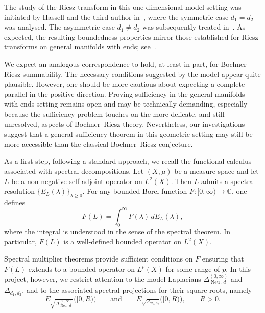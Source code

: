 \documentclass[12pt]{amsart}
\newcommand\Neu{\operatorname{Neu}}
\newcommand\LapoN{\Delta^{(0, \infty)}_{\Neu, d}}
\newcommand\C{\mathbb{C}}
\begin{document}
 The study of the Riesz transform in this one-dimensional model setting was initiated by Hassell and the third author in~\cite{HS1D}, where the symmetric case \(d_1=d_2\) was analysed. The asymmetric case \(d_1\neq d_2\) was subsequently treated in~\cite{HE_phd,Nix}. As expected, the resulting boundedness properties mirror those established for Riesz transforms on general manifolds with ends; see~\cite{HS,HNS,HE_phd}.



 We expect an analogous correspondence to hold, at least in part, for
Bochner--Riesz summability. The necessary conditions suggested by the model
appear quite plausible. However, one should be more cautious about expecting a
complete parallel in the positive direction. Proving sufficiency in the general
manifolds-with-ends setting remains open and may be technically demanding,
especially because the sufficiency problem touches on the more delicate, and
still unresolved, aspects of Bochner--Riesz theory. Nevertheless, our
investigations suggest that a general sufficiency theorem in this geometric
setting may still be more accessible than the classical Bochner--Riesz
conjecture.





As a first step, following a standard approach, we recall the functional calculus
associated with spectral decompositions. Let \((X,\mu)\) be a measure space and let
\(L\) be a non-negative self-adjoint operator on \(L^2(X)\). Then \(L\) admits a
spectral resolution \(\{E_L(\lambda)\}_{\lambda\ge 0}\). For any bounded Borel
function \(F:[0,\infty)\to\C\), one defines
\begin{equation}\label{eq1.1}
F(L)=\int_{0}^{\infty} F(\lambda)\, dE_L(\lambda),
\end{equation}
where the integral is understood in the sense of the spectral theorem. In
particular, \(F(L)\) is a well-defined bounded operator on \(L^2(X)\).


Spectral multiplier theorems provide sufficient conditions on \(F\) ensuring that
\(F(L)\) extends to a bounded operator on \(L^p(X)\) for some range of \(p\).
In this project, however, we restrict attention to the model Laplacians
\(\LapoN\) and \(\Delta_{d_1,d_2}\), and to the associated spectral projections
for their square roots, namely
\[
E_{\sqrt{\LapoN }}\big([0,R)\big)
\qquad\text{and}\qquad
E_{\sqrt{\Delta_{d_1,d_2}}}\big([0,R)\big),\qquad R>0.
\]
\end{document}
